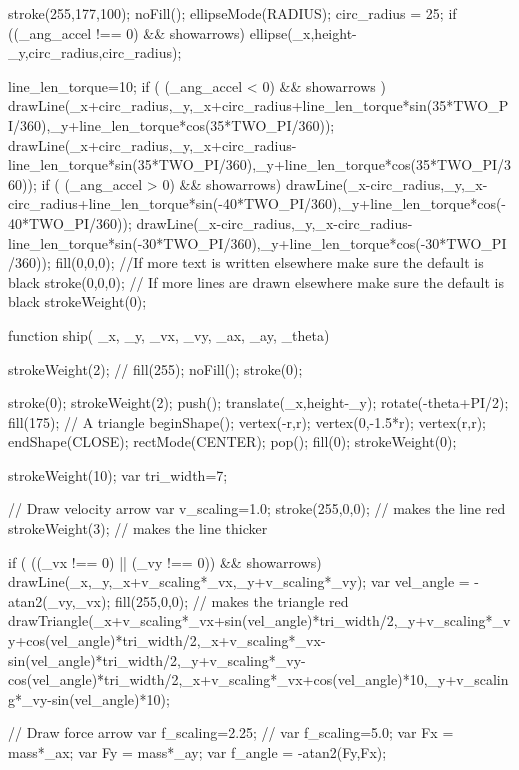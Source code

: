 \documentclass{ximera}
\begin{document}
\begin{javascriptCode}
{{    stroke(255,177,100);
    noFill();
    ellipseMode(RADIUS); 
    circ_radius = 25;   
    if ((_ang_accel !== 0) && showarrows) {
    ellipse(_x,height-_y,circ_radius,circ_radius);
    }

    line_len_torque=10;
    if ( (_ang_accel < 0) && showarrows ) {
	drawLine(_x+circ_radius,_y,_x+circ_radius+line_len_torque*sin(35*TWO_PI/360),_y+line_len_torque*cos(35*TWO_PI/360));
	drawLine(_x+circ_radius,_y,_x+circ_radius-line_len_torque*sin(35*TWO_PI/360),_y+line_len_torque*cos(35*TWO_PI/360));
    }
    if ( (_ang_accel > 0) && showarrows) {
	drawLine(_x-circ_radius,_y,_x-circ_radius+line_len_torque*sin(-40*TWO_PI/360),_y+line_len_torque*cos(-40*TWO_PI/360));
	drawLine(_x-circ_radius,_y,_x-circ_radius-line_len_torque*sin(-30*TWO_PI/360),_y+line_len_torque*cos(-30*TWO_PI/360));
    }
      fill(0,0,0); //If more text is written elsewhere make sure the default is black
    stroke(0,0,0); // If more lines are drawn elsewhere make sure the default is black
    strokeWeight(0);

}

function ship( _x,  _y, _vx, _vy, _ax, _ay, _theta)
{
    strokeWeight(2);
    //    fill(255);
    noFill();
    stroke(0);

    stroke(0);
    strokeWeight(2);
    push();
    translate(_x,height-_y);
    rotate(-theta+PI/2);
    fill(175);
    // A triangle
    beginShape();
    vertex(-r,r);
    vertex(0,-1.5*r);
    vertex(r,r);
    endShape(CLOSE);
    rectMode(CENTER);
    pop();
    fill(0);
    strokeWeight(0);
  
  
  
    strokeWeight(10);
    var tri_width=7;

    // Draw velocity arrow
    var v_scaling=1.0;
    stroke(255,0,0); // makes the line red
    strokeWeight(3); // makes the line thicker

    if ( ((_vx !== 0) || (_vy !== 0)) && showarrows) {
        drawLine(_x,_y,_x+v_scaling*_vx,_y+v_scaling*_vy);
        var vel_angle = -atan2(_vy,_vx);
        fill(255,0,0); // makes the triangle red
        drawTriangle(_x+v_scaling*_vx+sin(vel_angle)*tri_width/2,_y+v_scaling*_vy+cos(vel_angle)*tri_width/2,_x+v_scaling*_vx-sin(vel_angle)*tri_width/2,_y+v_scaling*_vy-cos(vel_angle)*tri_width/2,_x+v_scaling*_vx+cos(vel_angle)*10,_y+v_scaling*_vy-sin(vel_angle)*10);
    }

     // Draw force arrow
    var f_scaling=2.25;
//    var f_scaling=5.0;
    var Fx = mass*_ax;
    var Fy = mass*_ay;
    var f_angle = -atan2(Fy,Fx);

}}
\end{javascriptCode}
\end{document}
